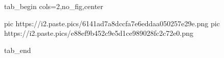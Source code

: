  
 
 
 
 


\ifcmt
  tab_begin cols=2,no_fig,center

     pic https://i2.paste.pics/6141ad7a8dccfa7e6eddaa050257e29e.png
		 pic https://i2.paste.pics/e88ef9b452c9e5d1ce989028fc2c72e0.png

  tab_end
\fi
